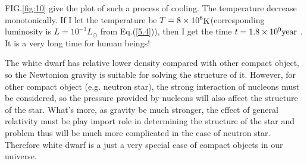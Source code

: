 \documentclass[reprint]{revtex4-1}
\begin{document}
FIG.\ref{fig:10} give the plot of such a process of cooling. The temperature decrease monotonically. If I let the temperature be $T = 8 \times {10^6}{\mathop{\rm K}\nolimits} $(corresponding luminosity is $L=10^{-3}L_{\odot}$  from Eq.(\ref{5.4})), then I get the time $t = 1.8 \times {10^9}{\mathop{\rm year}\nolimits} $ . It is a very long time for human beings!\par
The white dwarf has relative lower density compared with other compact object, so the Newtonion gravity is suitable for solving the structure of it. However, for other compact object (e.g. neutron star), the strong interaction of nucleons must be considered, so the pressure provided by nucleons will also affect the structure of the star. What’s more, as gravity be much stronger, the effect of general relativity must be play import role in determining the structure of the star and problem thus will be much more complicated in the case of neutron star. Therefore white dwarf is a just a very special case of compact objects in our universe. 
\end{document}
